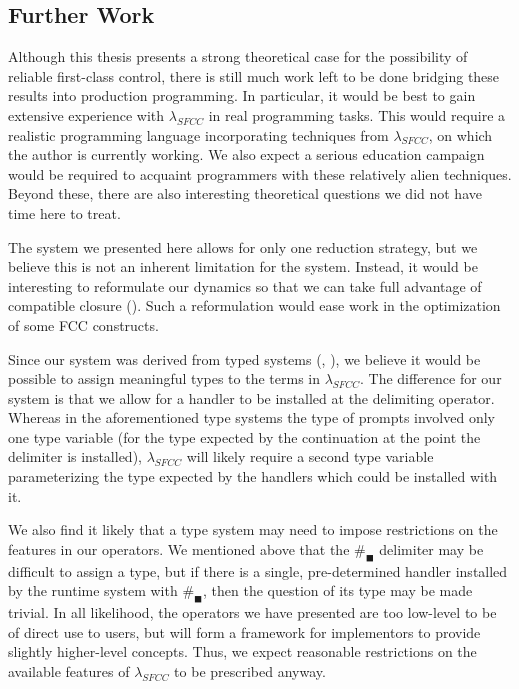 \documentclass[11pt]{article}
\begin{document}
\subsection{Further Work}

Although this thesis presents a strong theoretical case for the possibility of reliable first-class control, there is still much work left to be done bridging these results into production programming.
In particular, it would be best to gain extensive experience with $\lambda_{SFCC}$ in real programming tasks.
This would require a realistic programming language incorporating techniques from $\lambda_{SFCC}$, on which the author is currently working.
We also expect a serious education campaign would be required to acquaint programmers with these relatively alien techniques.
Beyond these, there are also interesting theoretical questions we did not have time here to treat.

The system we presented here allows for only one reduction strategy, but we believe this is not an inherent limitation for the system.
Instead, it would be interesting to reformulate our dynamics so that we can take full advantage of compatible closure (\cite{LambdaWithTypes}).
Such a reformulation would ease work in the optimization of some FCC constructs.

Since our system was derived from typed systems (\cite{MFDC}, \cite{Gunter:1995}), we believe it would be possible to assign meaningful types to the terms in $\lambda_{SFCC}$.
The difference for our system is that we allow for a handler to be installed at the delimiting operator.
Whereas in the aforementioned type systems the type of prompts involved only one type variable (for the type expected by the continuation at the point the delimiter is installed), $\lambda_{SFCC}$ will likely require a second type variable parameterizing the type expected by the handlers which could be installed with it.

We also find it likely that a type system may need to impose restrictions on the features in our operators.
We mentioned above that the $\#_\blacksquare$ delimiter may be difficult to assign a type, but if there is a single, pre-determined handler installed by the runtime system with $\#_\blacksquare$, then the question of its type may be made trivial.
In all likelihood, the operators we have presented are too low-level to be of direct use to users, but will form a framework for implementors to provide slightly higher-level concepts.
Thus, we expect reasonable restrictions on the available features of $\lambda_{SFCC}$ to be prescribed anyway.
\end{document}
